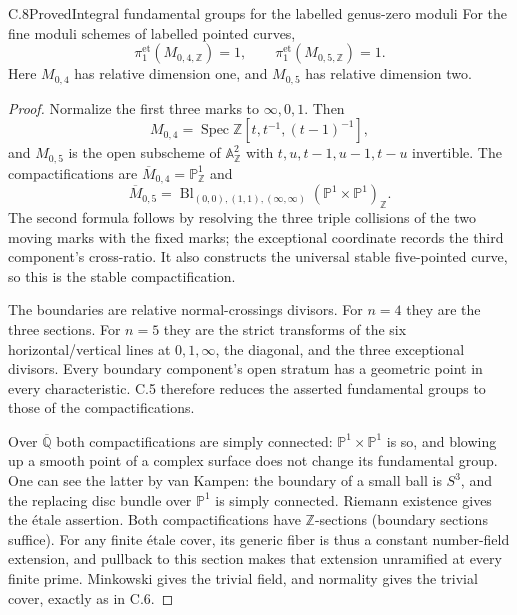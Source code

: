 \begin{statement}{C.8}{Proved}{Integral fundamental groups for the labelled genus-zero moduli}
For the fine moduli schemes of labelled pointed curves,
\[
 \pi_1^{\mathrm{et}}(M_{0,4,\mathbb Z})=1,
 \qquad
 \pi_1^{\mathrm{et}}(M_{0,5,\mathbb Z})=1.
\]
Here $M_{0,4}$ has relative dimension one, and $M_{0,5}$
has relative dimension two.
\end{statement}
\begin{proof}
Normalize the first three marks to $\infty,0,1$. Then
\[
 M_{0,4}=\operatorname{Spec}\mathbb Z
       [t,t^{-1},(t-1)^{-1}],
\]
and $M_{0,5}$ is the open subscheme of $\mathbb A^2_{\mathbb Z}$
with $t,u,t-1,u-1,t-u$ invertible. The compactifications are
$\overline M_{0,4}=\mathbb P^1_{\mathbb Z}$ and
\[
 \overline M_{0,5}
  =\operatorname{Bl}_{(0,0),(1,1),(\infty,\infty)}
       (\mathbb P^1\times\mathbb P^1)_{\mathbb Z}.
\]
The second formula follows by resolving the three triple
collisions of the two moving marks with the fixed marks;
the exceptional coordinate records the third component's
cross-ratio. It also constructs the universal stable
five-pointed curve, so this is the stable compactification.

The boundaries are relative normal-crossings divisors.
For $n=4$ they are the three sections. For $n=5$ they are
the strict transforms of the six horizontal/vertical lines
at $0,1,\infty$, the diagonal, and the three exceptional
divisors. Every boundary component's open stratum has a
geometric point in every characteristic. C.5 therefore
reduces the asserted fundamental groups to those of the
compactifications.

Over $\overline{\mathbb Q}$ both compactifications are
simply connected: $\mathbb P^1\times\mathbb P^1$ is so,
and blowing up a smooth point of a complex surface does
not change its fundamental group. One can see the latter
by van Kampen: the boundary of a small ball is $S^3$, and
the replacing disc bundle over $\mathbb P^1$ is simply
connected. Riemann existence gives the \'etale assertion.
Both compactifications have $\mathbb Z$-sections (boundary
sections suffice). For any finite \'etale cover, its
generic fiber is thus a constant number-field extension,
and pullback to this section makes that extension unramified
at every finite prime. Minkowski gives the trivial field,
and normality gives the trivial cover, exactly as in C.6.
\end{proof}

